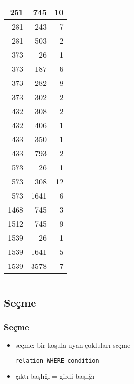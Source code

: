 \documentclass[dvipsnames]{beamer}
\theoremstyle{plain}
\begin{document}
\begin{frame}
\begin{columns}[b]
    \begin{tiny}
    \begin{table}
      \begin{tabular}{|r|r|r|}\hline
    251 &     745 &  10\\\hline
    281 &     243 &   7\\\hline
    281 &     503 &   2\\\hline
    373 &      26 &   1\\\hline
    373 &     187 &   6\\\hline
    373 &     282 &   8\\\hline
    373 &     302 &   2\\\hline
    432 &     308 &   2\\\hline
    432 &     406 &   1\\\hline
    433 &     350 &   1\\\hline
    433 &     793 &   2\\\hline
    573 &      26 &   1\\\hline
    573 &     308 &  12\\\hline
    573 &    1641 &   6\\\hline
   1468 &     745 &   3\\\hline
   1512 &     745 &   9\\\hline
   1539 &      26 &   1\\\hline
   1539 &    1641 &   5\\\hline
   1539 &    3578 &   7\\\hline
      \end{tabular}
    \end{table}
    \end{tiny}
  \end{columns}
\end{frame}

\subsection{Seçme}

\begin{frame}[fragile]
  \frametitle{Seçme}

  \begin{itemize}
    \item \alert{seçme}: bir koşula uyan çokluları seçme
    \begin{lstlisting}
relation WHERE condition
    \end{lstlisting}
    
  \medskip
    \item çıktı başlığı = girdi başlığı
  \end{itemize}
\end{frame}
\end{document}
